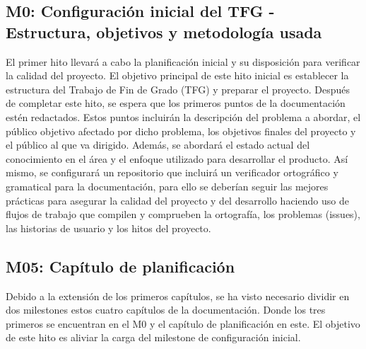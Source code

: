 \subsection{M0: Configuración inicial del TFG - Estructura, objetivos y metodología usada}
El primer hito llevará a cabo la planificación inicial y su disposición para verificar la calidad del
proyecto.
El objetivo principal de este hito inicial es establecer la estructura del Trabajo de Fin de Grado (TFG) y preparar el 
proyecto. Después de completar este hito, se espera que los primeros puntos de la documentación estén redactados. Estos 
puntos incluirán la descripción del problema a abordar, el público objetivo afectado por dicho problema, los objetivos 
finales del proyecto y el público al que va dirigido. Además, se abordará el estado actual del conocimiento en el área y 
el enfoque utilizado para desarrollar el producto. Así mismo, se configurará un repositorio que incluirá un verificador 
ortográfico y gramatical para la documentación, para ello se deberían seguir las mejores prácticas para asegurar la 
calidad del proyecto y del desarrollo haciendo uso de flujos de trabajo que compilen y comprueben la ortografía, los 
problemas (issues), las historias de usuario y los hitos del proyecto.

\subsection{M05: Capítulo de planificación}
Debido a la extensión de los primeros capítulos, se ha visto necesario dividir en dos milestones estos cuatro capítulos 
de la documentación. Donde los tres primeros se encuentran en el M0 y el capítulo de planificación en este.
El objetivo de este hito es aliviar la carga del milestone de configuración inicial.\vspace{0.5cm}







